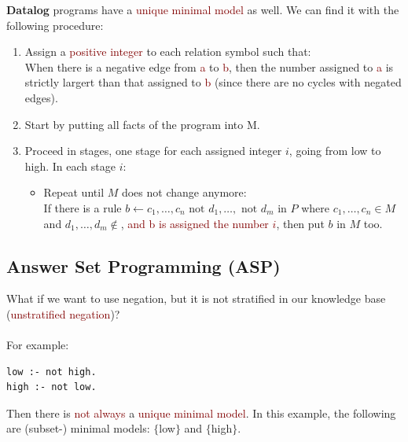 \textbf{\textcolor{PineGreen}{Datalog}} programs have a \textcolor{Maroon}{unique minimal model} as well.
We can find it with the following procedure:
\begin{enumerate}
    \item Assign a \textcolor{Maroon}{positive integer} to each relation symbol such that: \\
    When there is a negative edge from \textcolor{Maroon}{a} to \textcolor{Maroon}{b}, then the number assigned to \textcolor{Maroon}{a} is strictly largert than that assigned to \textcolor{Maroon}{b} (since there are no cycles with negated edges).
    \item Start by putting all facts of the program into M.
    \item Proceed in stages, one stage for each assigned integer $i$, going from low to high. In each stage $i$:
    \begin{itemize}
        \item Repeat until $M$ does not change anymore: \\
        If there is a rule \textcolor{NavyBlue}{$b \leftarrow c_1, \ldots, c_n \text{ not } d_1, \ldots, \text{ not } d_m$} in $P$ where $c_1, \ldots, c_n \in M$ and $d_1, \ldots, d_m \not \in$, \textcolor{Maroon}{and b is assigned the number $i$}, then put $b$ in $M$ too.
    \end{itemize}
\end{enumerate}

\subsection{Answer Set Programming (ASP)}
What if we want to use negation, but it is not stratified in our knowledge base (\textcolor{Maroon}{unstratified negation})?\\
\\
For example:
\begin{lstlisting}
low :- not high.
high :- not low.
\end{lstlisting}

Then there is \textcolor{Maroon}{not always} a \textcolor{Maroon}{unique minimal model}. In this example, the following are (subset-) minimal models: $\{$low$\}$ and $\{$high$\}$.


